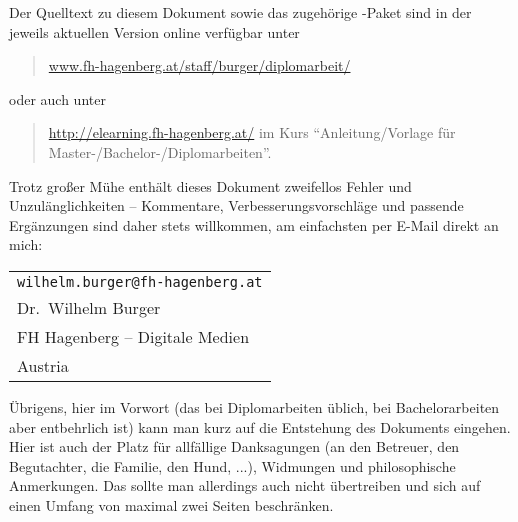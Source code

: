 Der Quelltext zu diesem Dokument sowie das zugehörige
\latex-Paket sind in der jeweils aktuellen Version online
verfügbar unter
%
\begin{quote}
\url{www.fh-hagenberg.at/staff/burger/diplomarbeit/}
\end{quote}
%
oder auch unter
%
\begin{quote}
\url{http://elearning.fh-hagenberg.at/} \newline
im Kurs "`Anleitung/Vorlage für Master-/Bachelor-/Diplomarbeiten"'.
\end{quote}
%
Trotz großer Mühe enthält dieses Dokument zweifellos Fehler und Unzulänglichkeiten
-- Kommentare, Verbesserungsvorschläge und passende Ergänzungen
sind daher stets willkommen, am einfachsten per E-Mail direkt an mich:
\begin{center}%
\begin{tabular}{l}
\nolinkurl{wilhelm.burger@fh-hagenberg.at} \\
Dr.\ Wilhelm Burger \\
FH Hagenberg -- Digitale Medien\\
Austria
\end{tabular}
\end{center}

\noindent
Übrigens, hier im Vorwort (das bei Diplomarbeiten üblich, bei Bachelorarbeiten 
aber entbehrlich ist) kann man kurz auf die Entstehung  des Dokuments eingehen.
Hier ist auch der Platz für allfällige Danksagungen (\zB an den Betreuer, 
den Begutachter, die Familie, den Hund, ...), Widmungen und philosophische 
Anmerkungen. Das sollte man allerdings auch nicht übertreiben und sich auf 
einen Umfang von maximal zwei Seiten beschränken.





